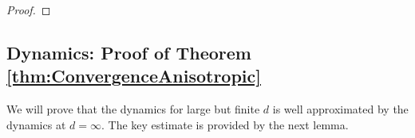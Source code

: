 \documentclass[11pt]{article}
\begin{document}
\begin{proof}
%
%



\end{proof}




\subsection{Dynamics: Proof of Theorem \ref{thm:ConvergenceAnisotropic}}

We will prove that the dynamics for large but finite $d$ is
well approximated by the dynamics at $d=\infty$. The key estimate is provided by the next lemma.
%
\end{document}
